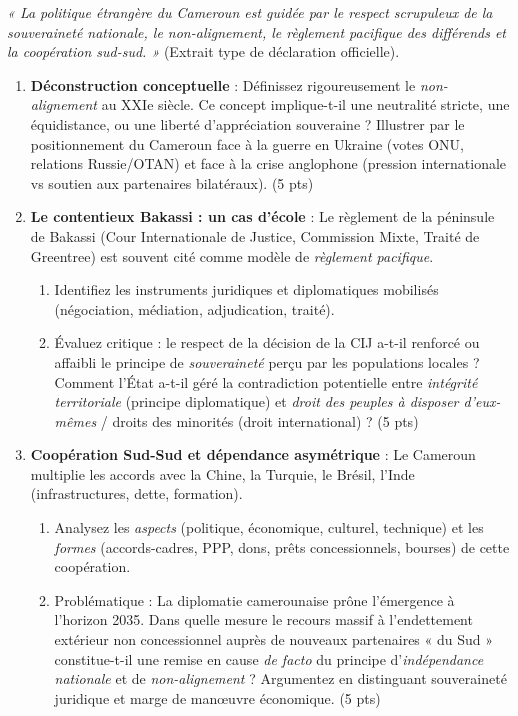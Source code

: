 \documentclass[11pt]{article}
\begin{document}
\begin{exercice}
\textit{« La politique étrangère du Cameroun est guidée par le respect scrupuleux de la souveraineté nationale, le non-alignement, le règlement pacifique des différends et la coopération sud-sud. »} (Extrait type de déclaration officielle).

\begin{enumerate}
    \item \textbf{Déconstruction conceptuelle} : Définissez rigoureusement le \textit{non-alignement} au XXIe siècle. Ce concept implique-t-il une neutralité stricte, une équidistance, ou une liberté d'appréciation souveraine ? Illustrer par le positionnement du Cameroun face à la guerre en Ukraine (votes ONU, relations Russie/OTAN) et face à la crise anglophone (pression internationale vs soutien aux partenaires bilatéraux). (5 pts)
    
    \item \textbf{Le contentieux Bakassi : un cas d'école} : Le règlement de la péninsule de Bakassi (Cour Internationale de Justice, Commission Mixte, Traité de Greentree) est souvent cité comme modèle de \textit{règlement pacifique}.
    \begin{enumerate}
        \item Identifiez les instruments juridiques et diplomatiques mobilisés (négociation, médiation, adjudication, traité).
        \item Évaluez critique : le respect de la décision de la CIJ a-t-il renforcé ou affaibli le principe de \textit{souveraineté} perçu par les populations locales ? Comment l'État a-t-il géré la contradiction potentielle entre \textit{intégrité territoriale} (principe diplomatique) et \textit{droit des peuples à disposer d'eux-mêmes} / droits des minorités (droit international) ? (5 pts)
    \end{enumerate}
    
    \item \textbf{Coopération Sud-Sud et dépendance asymétrique} : Le Cameroun multiplie les accords avec la Chine, la Turquie, le Brésil, l'Inde (infrastructures, dette, formation). 
    \begin{enumerate}
        \item Analysez les \textit{aspects} (politique, économique, culturel, technique) et les \textit{formes} (accords-cadres, PPP, dons, prêts concessionnels, bourses) de cette coopération.
        \item Problématique : La diplomatie camerounaise prône l'émergence à l'horizon 2035. Dans quelle mesure le recours massif à l'endettement extérieur non concessionnel auprès de nouveaux partenaires « du Sud » constitue-t-il une remise en cause \textit{de facto} du principe d'\textit{indépendance nationale} et de \textit{non-alignement} ? Argumentez en distinguant souveraineté juridique et marge de manœuvre économique. (5 pts)
    \end{enumerate}
\end{enumerate}
\end{exercice}
\end{document}

